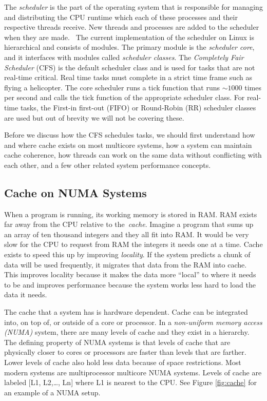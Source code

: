 \documentclass{sig-alternate}
\begin{document}
The \emph{scheduler} is the part of the operating system that is responsible for managing and distributing the CPU runtime which each of these processes and their respective threads receive. New threads and processes are added to the scheduler when they are made.~\cite{Lozi:2016} The current implementation of the scheduler on Linux is hierarchical and consists of modules. The primary module is the \emph{scheduler core}, and it interfaces with modules called \emph{scheduler classes}. The \emph{Completely Fair Scheduler} (CFS) is the default scheduler class and is used for tasks that are not real-time critical. Real time tasks must complete in a strict time frame such as flying a helicopter. The core scheduler runs a tick function that runs ${\sim}1000$ times per second and calls the tick function of the appropriate scheduler class. For real-time tasks, the First-in first-out (FIFO) or Round-Robin (RR) scheduler classes are used but out of brevity we will not be covering these.~\cite{SchedThesis}

Before we discuss how the CFS schedules tasks, we should first understand how and where cache exists on most multicore systems, how a system can maintain cache coherence, how threads can work on the same data without conflicting with each other, and a few other related system performance concepts.

\subsection{Cache on NUMA Systems}
\label{sec:cache}

When a program is running, its working memory is stored in RAM. RAM exists far away from the CPU relative to the~\emph{cache}. Imagine a program that sums up an array of ten thousand integers and they all fit into RAM. It would be very slow for the CPU to request from RAM the  integers it needs one at a time. Cache exists to speed this up by improving \emph{locality}. If the system predicts a chunk of data will be used frequently, it migrates that data from the RAM into cache. This improves locality because it makes the data more ``local'' to where it needs to be and improves performance because the system works less hard to load the data it needs.

The cache that a system has is hardware dependent. Cache can be integrated into, on top of, or outside of a core or processor. In a \emph{non-uniform memory access (NUMA)} system, there are many levels of cache and they exist in a hierarchy. The defining property of NUMA systems is that levels of cache that are physically closer to cores or processors are faster than levels that are farther. Lower levels of cache also hold less data because of space restrictions. Most modern systems are multiprocessor multicore NUMA systems. Levels of cache are labeled [L1, L2,\dots, Ln] where L1 is nearest to the CPU. See Figure \ref{fig:cache} for an example of a NUMA setup.
\end{document}
